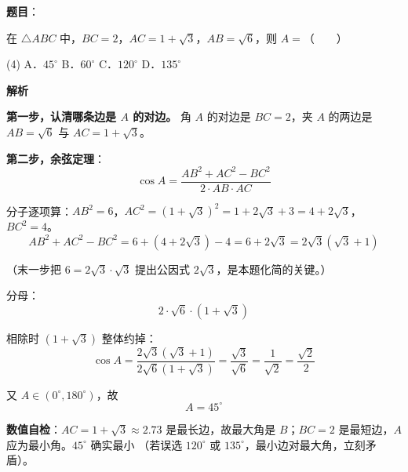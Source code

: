 \begin{answer}

\textbf{题目}：

在 $\triangle ABC$ 中，$BC=2$，$AC=1+\sqrt3$，$AB=\sqrt6$，则 $A=$\mbox{（　　）}

\begin{gkopts}(4)
\task A．$45^\circ$
\task B．$60^\circ$
\task C．$120^\circ$
\task D．$135^\circ$
\end{gkopts}

\textbf{解析}

\textbf{第一步，认清哪条边是 $A$ 的对边。} 角 $A$ 的对边是 $BC=2$，夹 $A$ 的两边是 $AB=\sqrt6$ 与 $AC=1+\sqrt3$。

\textbf{第二步，余弦定理}：
\nopagebreak[4]
\[\cos A=\frac{AB^2+AC^2-BC^2}{2\cdot AB\cdot AC}\]

分子逐项算：$AB^2=6$，$AC^2=\left(1+\sqrt3\right)^2=1+2\sqrt3+3=4+2\sqrt3$，$BC^2=4$。
\nopagebreak[4]
\[AB^2+AC^2-BC^2=6+\left(4+2\sqrt3\right)-4=6+2\sqrt3=2\sqrt3\left(\sqrt3+1\right)\]

（末一步把 $6=2\sqrt3\cdot\sqrt3$ 提出公因式 $2\sqrt3$，是本题化简的关键。）

分母：
\nopagebreak[4]
\[2\cdot\sqrt6\cdot\left(1+\sqrt3\right)\]

相除时 $\left(1+\sqrt3\right)$ 整体约掉：
\nopagebreak[4]
\[\cos A=\frac{2\sqrt3\left(\sqrt3+1\right)}{2\sqrt6\left(1+\sqrt3\right)}=\frac{\sqrt3}{\sqrt6}=\frac1{\sqrt2}=\frac{\sqrt2}{2}\]

又 $A\in(0^\circ,180^\circ)$，故
\nopagebreak[4]
\[A=45^\circ\]

\begin{gktip}
\textbf{数值自检}：$AC=1+\sqrt3\approx2.73$ 是最长边，故最大角是 $B$；$BC=2$ 是最短边，$A$ 应为最小角。$45^\circ$ 确实最小 （若误选 $120^\circ$ 或 $135^\circ$，最小边对最大角，立刻矛盾）。
\end{gktip}


\par\medskip

\end{answer}

